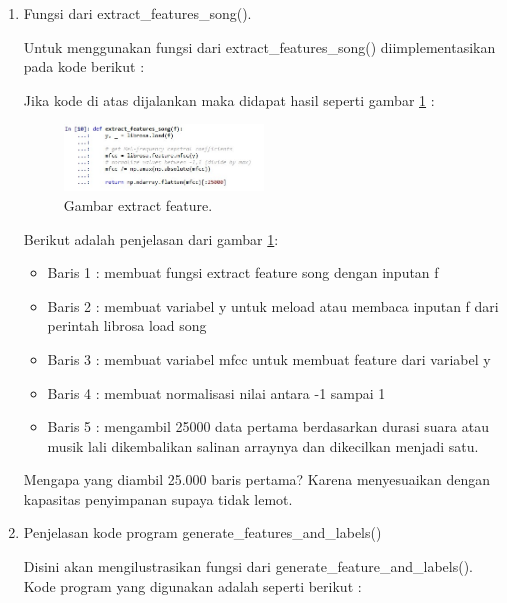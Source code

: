 \begin{enumerate}
\item Fungsi dari extract\_features\_song().
	\par Untuk menggunakan fungsi dari extract\_features\_song() diimplementasikan pada kode berikut :
	
	\par Jika kode di atas dijalankan maka didapat hasil seperti gambar \ref{no11} :
		\begin{figure}[ht]
		\centerline{\includegraphics[width=0.5\textwidth]{figures/chapter6/no11.jpg}}
		\caption{Gambar extract feature.}
		\label{no11}
		\end{figure}
	\par Berikut adalah penjelasan dari gambar \ref{no11}:
	\begin{itemize}
	\item Baris 1 : membuat fungsi extract feature song dengan inputan f
	\item Baris 2 : membuat variabel y untuk meload atau membaca inputan f dari perintah librosa load song
	\item Baris 3 : membuat variabel mfcc untuk membuat feature dari variabel y
	\item Baris 4 : membuat normalisasi nilai antara -1 sampai 1
	\item Baris 5 : mengambil 25000 data pertama berdasarkan durasi suara atau musik lali dikembalikan salinan arraynya dan dikecilkan menjadi satu.
	\end{itemize}
	
	\par  Mengapa yang diambil 25.000 baris pertama? Karena menyesuaikan dengan kapasitas penyimpanan supaya tidak lemot.

\item Penjelasan kode program generate\_features\_and\_labels()
	\par Disini akan mengilustrasikan fungsi dari generate\_feature\_and\_labels(). Kode program yang digunakan adalah  seperti berikut :
	

\end{enumerate}

